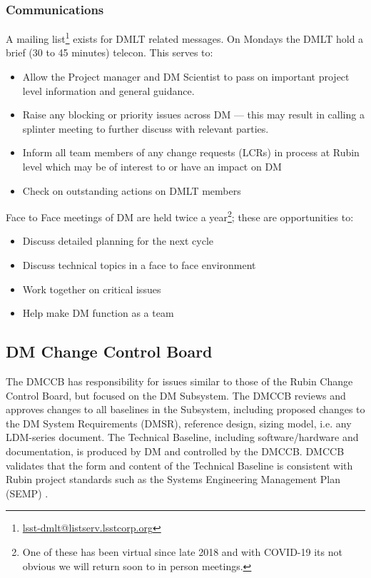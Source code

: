  \subsubsection{Communications}
A mailing list\footnote{\url{lsst-dmlt@listserv.lsstcorp.org}} exists for DMLT related messages.
On Mondays the DMLT hold a brief (30 to 45 minutes) telecon. This serves to:

\begin{itemize}
\item Allow the Project manager and DM Scientist  to pass on important project level information and general guidance.
\item Raise any blocking or priority issues across DM --- this may result in calling a splinter meeting to further discuss with relevant parties.
\item Inform all team members of any change requests (LCRs) in process at Rubin level which may be of interest to or have an impact on DM
\item Check on outstanding actions on DMLT members
\end{itemize}

Face to Face meetings of DM are held twice a year\footnote{One of these has been virtual since late 2018 and with COVID-19 its not obvious we will return soon to in person meetings.}; these are opportunities to:

\begin{itemize}
\item Discuss detailed planning for the next cycle
\item Discuss technical topics in a face to face environment
\item Work together on critical issues
\item Help make DM function as a team
\end{itemize}

\subsection{DM Change Control Board \label{sect:dmccb}}

The DMCCB has responsibility for issues similar to those of the Rubin Change Control Board, but focused on the DM Subsystem.
The DMCCB reviews and approves changes to all baselines in the Subsystem, including proposed changes to the DM System Requirements (DMSR), reference design, sizing model, i.e. any LDM-series document.
The Technical Baseline, including software/hardware and documentation, is produced by DM and controlled by the DMCCB.
DMCCB validates that the form and content of the Technical Baseline is consistent with Rubin project standards such as the Systems Engineering Management Plan (SEMP) .

